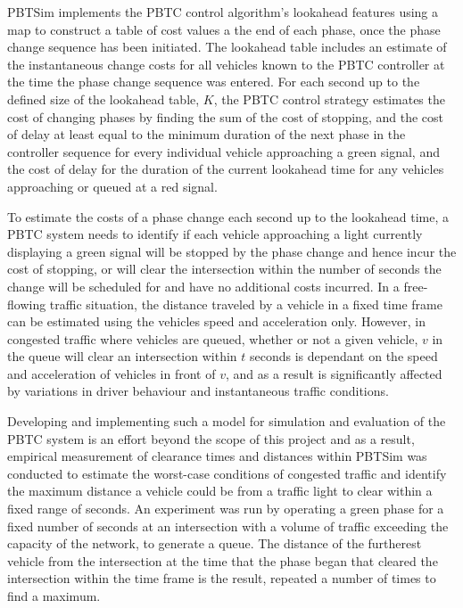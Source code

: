PBTSim implements the PBTC control algorithm's lookahead features using a map to construct a table of cost values a the end of each phase, once the phase change sequence has been initiated. The lookahead table includes an estimate of the instantaneous change costs for all vehicles known to the PBTC controller at the time the phase change sequence was entered. For each second up to the defined size of the lookahead table, $K$, the PBTC control strategy estimates the cost of changing phases by finding the sum of the cost of stopping, and the cost of delay at least equal to the minimum duration of the next phase in the controller sequence for every individual vehicle approaching a green signal, and the cost of delay for the duration of the current lookahead time for any vehicles approaching or queued at a red signal. 

To estimate the costs of a phase change each second up to the lookahead time, a PBTC system needs to identify if each vehicle approaching a light currently displaying a green signal will be stopped by the phase change and hence incur the cost of stopping, or will clear the intersection within the number of seconds the change will be scheduled for and have no additional costs incurred. In a free-flowing traffic situation, the distance traveled by a vehicle in a fixed time frame can be estimated using the vehicles speed and acceleration only. However, in congested traffic where vehicles are queued, whether or not a given vehicle, $v$ in the queue will clear an intersection within $t$ seconds is dependant on the speed and acceleration of vehicles in front of $v$, and as a result is significantly affected by variations in driver behaviour and instantaneous traffic conditions. 

Developing and implementing such a model for simulation and evaluation of the PBTC system is an effort beyond the scope of this project and as a result, empirical measurement of clearance times and distances within PBTSim was conducted to estimate the worst-case conditions of congested traffic and identify the maximum distance a vehicle could be from a traffic light to clear within a fixed range of seconds. An experiment was run by operating a green phase for a fixed number of seconds at an intersection with a volume of traffic exceeding the capacity of the network, to generate a queue. The distance of the furtherest vehicle from the intersection at the time that the phase began that cleared the intersection within the time frame is the result, repeated a number of times to find a maximum. 

